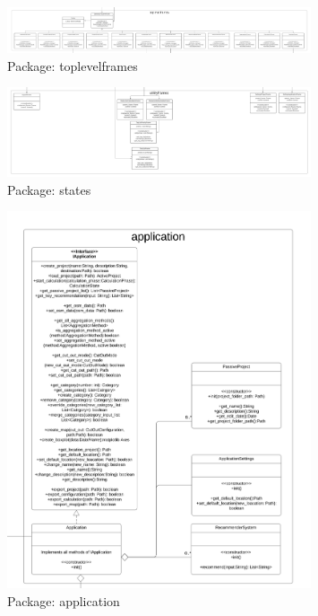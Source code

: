 \documentclass[parskip=full]{scrartcl} %
\begin{document}
\hypertarget{toplevelframes}{
\begin{figure}[hbt!]
  \centering
\includegraphics[width=0.8\textwidth]
        {pictures/toplevelframes.png}
  \caption{Package: toplevelframes}
  \label{fig:mvc}
\end{figure}
}

\hypertarget{utilityframes}{
\begin{figure}[hbt!]
  \centering
\includegraphics[width=0.8\textwidth]
        {pictures/utilityframes.png}
  \caption{Package: states}
  \label{fig:mvc}
\end{figure}
}

\hypertarget{application}{
\begin{figure}[hbt!]
  \centering
\includegraphics[width=0.8\textwidth]
        {pictures/application.png}
  \caption{Package: application}
  \label{fig:mvc}
\end{figure}
}
\end{document}
